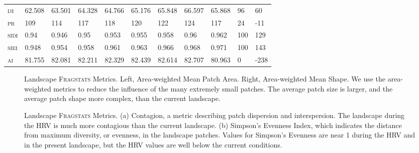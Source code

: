 \begin{landscape}
\begin{table}[!htbp]
\begin{tabular}{@{}lllllllllll@{}}
\small \textsc{iji }            & 62.508       & 63.501      & 64.328        & 64.766       & 65.176        & 65.848        & 66.597         & 65.868      & 96     & 60    \\
\small \textsc{pr}              & 109       & 114      & 117        & 118       & 120        & 122        & 124         & 117      & 24     & -11    \\
\small \textsc{sidi}            & 0.94       & 0.946      & 0.95        & 0.953       & 0.955        & 0.958        & 0.96         & 0.962      & 100     & 129    \\
\small \textsc{siei}            & 0.948       & 0.954      & 0.958        & 0.961       & 0.963        & 0.966        & 0.968         & 0.971      & 100     & 143    \\
\small \textsc{ai}              & 81.755       & 82.081      & 82.211        & 82.329       & 82.439        & 82.614        & 82.707         & 80.963      & 0     & -238     \\ \bottomrule
\end{tabular}
\end{table}
\end{landscape}


\clearpage
{}
\begin{figure}[!htbp]
  \centering
\caption{Landscape \textsc{Fragstats} Metrics. Left, Area-weighted Mean Patch Area. Right, Area-weighted Mean Shape. We use the area-weighted metrics to reduce the influence of the many extremely small patches. The average patch size is larger, and the average patch shape more complex, than the current landscape.} 
\label{fig:fragland_areashape}
\end{figure}

\begin{figure}[!htbp]
  \centering
\caption{Landscape \textsc{Fragstats} Metrics. (a) Contagion, a metric describing patch dispersion and interspersion. The landscape during the HRV is much more contagious than the current landscape. (b) Simpson's Evenness Index, which indicates the distance from maximum diversity, or evenness, in the landscape patches. Values for Simpson's Evenness are near 1 during the HRV and in the present landscape, but the HRV values are well below the current conditions.} 
\label{fig:fragland_contagsiei}
\end{figure}

